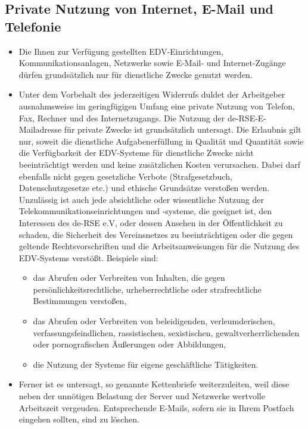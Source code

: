 \documentclass[a4paper, fontsize=11pt]{scrartcl}
\begin{document}
\subsection{Private Nutzung von Internet, E-Mail und Telefonie}
\begin{itemize}
  \item Die Ihnen zur Verfügung gestellten EDV-Einrichtungen, Kommunikationsanlagen, Netzwerke sowie E-Mail- und Internet-Zugänge dürfen grundsätzlich nur für dienstliche Zwecke genutzt werden.
  \item Unter dem Vorbehalt des jederzeitigen Widerrufs duldet der Arbeitgeber ausnahmsweise im geringfügigen Umfang eine private Nutzung von Telefon, Fax, Rechner und des Internetzugangs. Die Nutzung der de-RSE-E-Mailadresse für private Zwecke ist grundsätzlich untersagt. Die Erlaubnis gilt nur, soweit die dienstliche Aufgabenerfüllung in Qualität und Quantität sowie die Verfügbarkeit der EDV-Systeme für dienstliche Zwecke nicht beeinträchtigt werden und keine zusätzlichen Kosten verursachen. Dabei darf ebenfalls nicht gegen gesetzliche Verbote (Strafgesetzbuch, Datenschutzgesetze etc.) und ethische Grundsätze verstoßen werden. Unzulässig ist auch jede absichtliche oder wissentliche Nutzung der Telekommunikationseinrichtungen und -systeme, die geeignet ist, den Interessen des de-RSE e.V, oder dessen Ansehen in der Öffentlichkeit zu schaden, die Sicherheit des Vereinsnetzes zu beeinträchtigen oder die gegen geltende Rechtsvorschriften und die Arbeitsanweisungen für die Nutzung des EDV-Systems verstößt. Beispiele sind:
  \begin{itemize}
    \item das Abrufen oder Verbreiten von Inhalten, die gegen persönlichkeitsrechtliche, urheberrechtliche oder strafrechtliche Bestimmungen verstoßen,
    \item das Abrufen oder Verbreiten von beleidigenden, verleumderischen, verfassungsfeindlichen, rassistischen, sexistischen, gewaltverherrlichenden oder pornografischen Äußerungen oder Abbildungen,
    \item die Nutzung der Systeme für eigene geschäftliche Tätigkeiten.
  \end{itemize} 
  \item Ferner ist es untersagt, so genannte Kettenbriefe weiterzuleiten, weil diese neben der unnötigen Belastung der Server und Netzwerke wertvolle Arbeitszeit vergeuden. Entsprechende E-Mails, sofern sie in Ihrem Postfach eingehen sollten, sind zu löschen.

\end{itemize}
\end{document}
